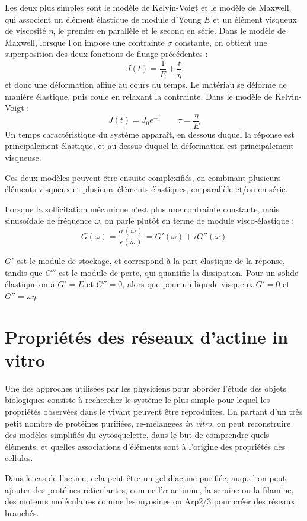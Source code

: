 \documentclass{report}
\begin{document}
Les deux plus simples sont le modèle de Kelvin-Voigt et le modèle de Maxwell, qui associent un élément élastique de module d'Young $E$ et un élément visqueux de viscosité $\eta$, le premier en parallèle et le second en série. 
Dans le modèle de Maxwell, lorsque l'on impose une contrainte $\sigma$ constante, on obtient une superposition des deux fonctions de fluage précédentes : 
$$J(t)=\frac{1}{E} + \frac{t}{\eta}$$ 
et donc une déformation affine au cours du temps. Le matériau se déforme de manière élastique, puis coule en relaxant la contrainte. 
Dans le modèle de Kelvin-Voigt : 
$$ J(t)=J_0 e^{-\frac{t}{\tau}} \qquad \tau=\frac{\eta}{E}$$
Un temps caractéristique du système apparaît, en dessous duquel la réponse est principalement élastique, et au-dessus duquel la déformation est principalement visqueuse. 

Ces deux modèles peuvent être ensuite complexifiés, en combinant plusieurs éléments visqueux et plusieurs éléments élastiques, en parallèle et/ou en série. 

Lorsque la sollicitation mécanique n'est plus une contrainte constante, mais sinusoïdale de fréquence $\omega$, on parle plutôt en terme de module visco-élastique : 
$$G(\omega) = \frac{\sigma(\omega)}{\epsilon(\omega)} = G'(\omega)+iG''(\omega)$$

$G'$ est le module de stockage, et correspond à la part élastique de la réponse, tandis que $G''$ est le module de perte, qui quantifie la dissipation. Pour un solide élastique on a $G'=E$ et $G''=0$, alors que pour un liquide visqueux $G'=0$ et $G''=\omega \eta$. 

\section{Propriétés des réseaux d'actine in vitro}

Une des approches utilisées par les physiciens pour aborder l'étude des objets biologiques consiste à rechercher le système le plus simple pour lequel les propriétés observées dans le vivant peuvent être reproduites. 
En partant d'un très petit nombre de protéines purifiées, re-mélangées \textit{in vitro}, on peut reconstruire des modèles simplifiés du cytosquelette, dans le but de comprendre quels éléments, et quelles associations d'éléments sont à l'origine des propriétés des cellules. 

Dans le cas de l'actine, cela peut être un gel d'actine purifiée, auquel on peut ajouter des protéines réticulantes, comme l'$\alpha$-actinine, la scruine ou la filamine, des moteurs moléculaires comme les myosines ou Arp2/3 pour créer des réseaux branchés. 
\end{document}
